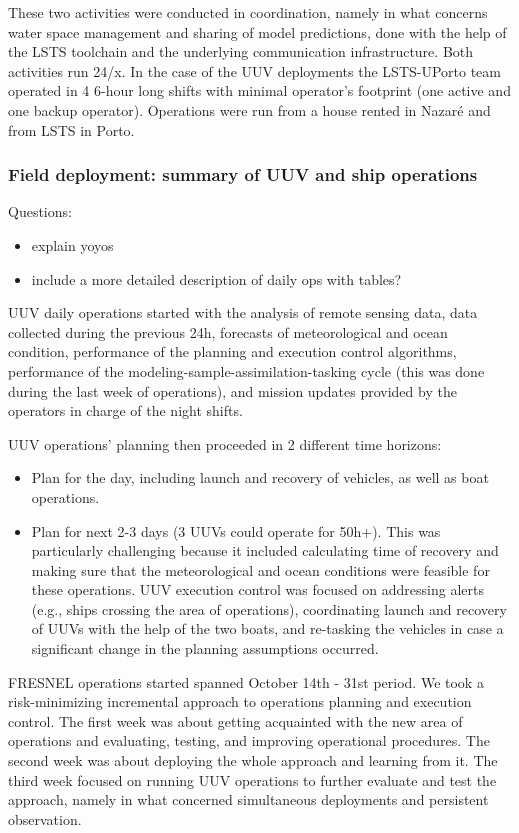 These two activities were conducted in coordination, namely in what concerns water space management and sharing of model predictions, done with the help of the LSTS toolchain and the underlying communication infrastructure. Both activities run 24/x. In the case of the UUV deployments the LSTS-UPorto team operated in 4 6-hour long shifts with minimal operator’s footprint (one active and one backup operator). Operations were run from a house rented in Nazaré and from LSTS in Porto.


\subsubsection{Field deployment: summary of UUV and ship operations}

Questions:
\begin{itemize}
    \item explain yoyos
    \item include a more detailed description of daily ops with tables?
\end{itemize}


UUV daily operations started with the analysis of remote sensing data, data collected during the previous 24h, forecasts of meteorological and ocean condition, performance of the planning and execution control algorithms, performance of the modeling-sample-assimilation-tasking cycle (this was done during the last week of operations), and mission updates provided by the operators in charge of the night shifts.

UUV operations’ planning then proceeded in 2 different time horizons:
\begin{itemize}
\item Plan for the day, including launch and recovery of vehicles, as well as boat operations.
\item Plan for next 2-3 days (3 UUVs could operate for 50h+). This was particularly challenging because it included calculating time of recovery and making sure that the meteorological and ocean conditions were feasible for these operations.
UUV execution control was focused on addressing alerts (e.g., ships crossing the area of operations), coordinating launch and recovery of UUVs with the help of the two boats, and re-tasking the vehicles in case a significant change in the planning assumptions occurred. 
\end{itemize}

FRESNEL operations started spanned October 14th - 31st period. We took a risk-minimizing incremental approach to operations planning and execution control. The first week was about getting acquainted with the new area of operations and evaluating, testing, and improving operational procedures. The second week was about deploying the whole approach and learning from it. The third week focused on running UUV operations to further evaluate and test the approach, namely in what concerned simultaneous deployments and persistent observation.

